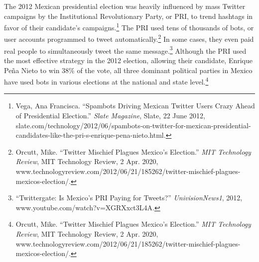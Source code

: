 \documentclass[10pt, letterpaper]{article}
\begin{document}
The 2012 Mexican presidential election was heavily influenced by mass
Twitter campaigns by the Institutional Revolutionary Party, or PRI, to
trend hashtags in favor of their candidate's campaigns.\footnote{Vega,
  Ana Francisca. ``Spambots Driving Mexican Twitter Users Crazy Ahead of
  Presidential Election.'' \emph{Slate Magazine}, Slate, 22 June 2012,
  slate.com/technology/2012/06/spambots-on-twitter-for-mexican-presidential-candidates-like-the-pri-s-enrique-pena-nieto.html.}
The PRI used tens of thousands of bots, or user accounts programmed to
tweet automatically.\footnote{Orcutt, Mike. ``Twitter Mischief Plagues
  Mexico's Election.'' \emph{MIT Technology Review}, MIT Technology
  Review, 2 Apr. 2020,
  www.technologyreview.com/2012/06/21/185262/twitter-mischief-plagues-mexicos-election/.}
In some cases, they even paid real people to simultaneously tweet the
same message.\footnote{``Twittergate: Is Mexico's PRI Paying for
  Tweets?'' \emph{UnivisionNews1}, 2012,
  www.youtube.com/watch?v=XGRXxct3L4A.} Although the PRI used the most
effective strategy in the 2012 election, allowing their candidate,
Enrique Peña Nieto to win 38\% of the vote, all three dominant political
parties in Mexico have used bots in various elections at the national
and state level.\footnote{Orcutt, Mike. ``Twitter Mischief Plagues
  Mexico's Election.'' \emph{MIT Technology Review}, MIT Technology
  Review, 2 Apr. 2020,
  www.technologyreview.com/2012/06/21/185262/twitter-mischief-plagues-mexicos-election/.} \\
\end{document}
